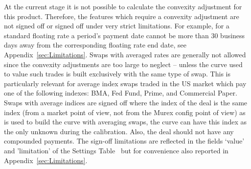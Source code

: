 \documentclass[]{pmv_report} %
\begin{document}
{At the current stage it is not possible to calculate the convexity adjustment for this product.
Therefore, the features which require a convexity adjustment are not signed off or signed off under very strict limitations.
For example, for a standard floating rate a period's payment date cannot be more than $30$ business days away from the corresponding floating rate end date, see Appendix~\ref{sec:Limitations}.
\newline\newline
Swaps with averaged rates are generally not allowed since the convexity adjustments are too large to neglect -- unless the curve used to value such trades is built exclusively with the same type of swap.
This is particularly relevant for average index swaps traded in the US market which pay one of the following indexes: BMA, Fed Fund, Prime, and Commercial Paper.
Swaps with average indices are signed off where the index of the deal is the same index (from a market point of view, not from the Murex config point of view) as is used to build the curve with averaging swaps, the curve can have this index as the only unknown during the calibration.
Also, the deal should not have any compounded payments.
\newline\newline
The sign-off limitations are reflected in the fields `value' and 'limitation' of the Settings Table~\cite{MxSettings.IRS} but for convenience also reported in Appendix~\ref{sec:Limitations}.
}

\makecoverpage
\end{document}
